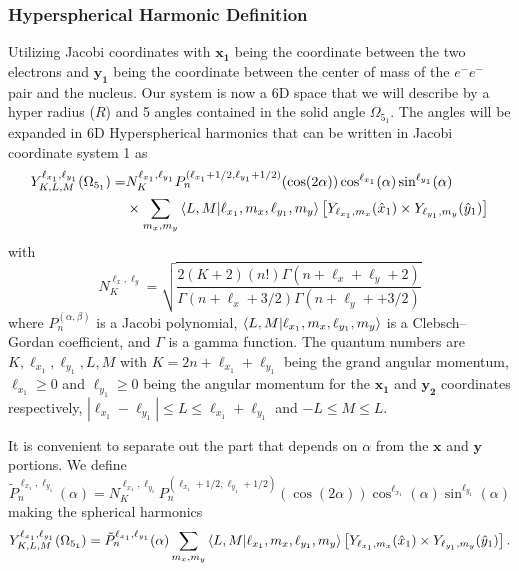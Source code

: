 \subsubsection{Hyperspherical Harmonic Definition} %
\label{ssub:spherical_harmonics}
Utilizing Jacobi coordinates with $\mathbf{x_1}$ being the coordinate between the two electrons and $\mathbf{y_1}$ being the coordinate between the center of mass of the $e^-e^-$ pair and the nucleus. Our system is now a 6D space that we will describe by a hyper radius ($R$) and 5 angles contained in the solid angle $\Omega_{5_1}$. The angles will be expanded in 6D Hyperspherical harmonics that can be written in Jacobi coordinate system 1 as
\begin{align}
    Y^{\ell_{x_1},\ell_{y_1}}_{K,L,M}(\Omega_{5_1}) =& N^{\ell_{x_1},\ell_{y_1}}_K P_n^{(\ell_{x_1}+1/2,\ell_{y_1}+1/2)}(\cos(2\alpha)) \cos^{\ell_{x_1}}(\alpha) \sin^{\ell_{y_1}}(\alpha) \\ 
    &\times\sum_{m_x,m_y}\bra{L,M}\ket{\ell_{x_1},m_x,\ell_{y_1},m_y}  \left[Y_{\ell_{x_1},m_x}(\hat{x}_1)\times Y_{\ell_{y_1},m_y}(\hat{y}_1)\right]
\end{align}
with
\begin{equation}
    N^{\ell_x,\ell_y}_K = \sqrt{\frac{2(K+2)(n!)\Gamma (n+\ell_x+\ell_y+2)}{\Gamma (n+\ell_x+3/2) \Gamma (n+\ell_y++3/2)}}
\end{equation}
where $P_n^{(\alpha,\beta)}$ is a Jacobi polynomial, $\bra{L,M}\ket{\ell_{x_1},m_x,\ell_{y_1},m_y}$ is a Clebsch–Gordan coefficient, and $\Gamma$ is a gamma function. 
The quantum numbers are $K,\ell_{x_1},\ell_{y_1},L,M$ with $K=2n+\ell_{x_1}+\ell_{y_1}$ being the grand angular momentum, $\ell_{x_1}\ge0$ and $\ell_{y_1}\ge0$ being the angular momentum for the $\mathbf{x_1}$ and $\mathbf{y_2}$ coordinates respectively, $|\ell_{x_1}-\ell_{y_1}|\le L \le \ell_{x_1}+\ell_{y_1}$ and $-L \le M \le L$.

It is convenient to separate out the part that depends on $\alpha$ from the $\mathbf{x}$ and $\mathbf{y}$ portions. We define
\begin{equation}
    \tilde{P}^{\ell_{x_1},\ell_{y_1}}_{n}(\alpha) = N^{\ell_{x_1},\ell_{y_1}}_K P_n^{(\ell_{x_1}+1/2,\ell_{y_1}+1/2)}(\cos(2\alpha)) \cos^{\ell_{x_1}}(\alpha) \sin^{\ell_{y_1}}(\alpha) 
\end{equation}
making the spherical harmonics 
\begin{equation}
    Y^{\ell_{x_1},\ell_{y_1}}_{K,L,M}(\Omega_{5_1}) =\tilde{P}^{\ell_{x_1},\ell_{y_1}}_{n}(\alpha)\sum_{m_x,m_y}\bra{L,M}\ket{\ell_{x_1},m_x,\ell_{y_1},m_y}  \left[Y_{\ell_{x_1},m_x}(\hat{x}_1)\times Y_{\ell_{y_1},m_y}(\hat{y}_1)\right].
\end{equation}
 

